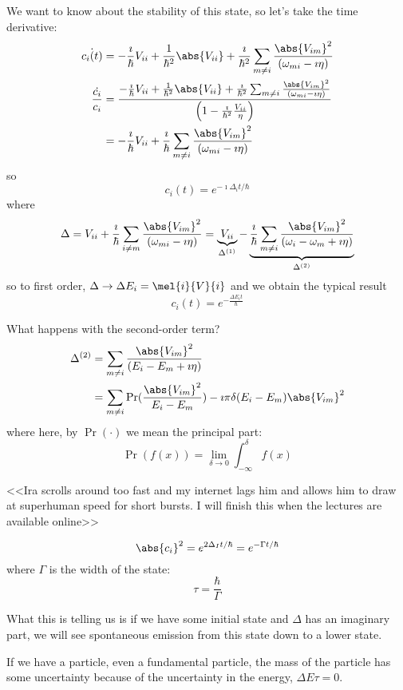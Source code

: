 \documentclass[a4paper,twoside,master.tex]{subfiles}
\begin{document}
We want to know about the stability of this state, so let's take the time derivative:
\begin{align}
    \dot{c_i(t)} &= - \frac{\imath}{\hbar} V_{ii} + \frac{1}{\hbar^2} \abs{V_{ii}} + \frac{\imath}{\hbar^2} \sum_{m \neq i} \frac{\abs{V_{im}}^2}{(\omega_{mi} - \imath \eta)} \\
    \frac{\dot{c_i}}{c_i} &= \frac{- \frac{\imath}{\hbar} V_{ii} + \frac{1}{\hbar^2} \abs{V_{ii}} + \frac{\imath}{\hbar^2} \sum_{m \neq i} \frac{\abs{V_{im}}^2}{(\omega_{mi} - \imath \eta)}}{\left( 1- \frac{\imath}{\hbar^2} \frac{V_{ii}}{\eta} \right)} \\
    &= - \frac{\imath}{\hbar} V_{ii} + \frac{\imath}{\hbar} \sum_{m \neq i} \frac{\abs{V_{im}}^2}{(\omega_{mi} - \imath \eta)}
\end{align}
so
\begin{equation}
    c_i(t) = e^{- \imath \Delta_i t / \hbar}
\end{equation}
where
\begin{equation}
    \Delta = V_{ii} + \frac{\imath}{\hbar} \sum_{i \neq m} \frac{\abs{V_{im}}^2}{(\omega_{mi} - \imath \eta)} = \underbrace{V_{ii}}_{\Delta^{(1)}} - \underbrace{\frac{\imath}{\hbar} \sum_{m \neq i} \frac{\abs{V_{im}}^2}{(\omega_i - \omega_m + \imath \eta)}}_{\Delta^{(2)}}
\end{equation}
so to first order, $ \Delta \to \Delta E_i = \mel{i}{V}{i} $ and we obtain the typical result
\begin{equation}
    c_i(t) = e^{- \frac{\Delta E_i t}{\hbar}}
\end{equation}

What happens with the second-order term?
\begin{align}
    \Delta^{(2)} &= \sum_{m \neq i} \frac{\abs{V_{im}}^2}{(E_i - E_m + \imath \eta)} \\
    &= \sum_{m \neq i} \Pr(\frac{\abs{V_{im}}^2}{E_i -E_m}) - \imath \pi \delta(E_i - E_m) \abs{V_{im}}^2
\end{align}
where here, by $ \Pr( \cdot) $ we mean the principal part:
\begin{equation}
    \Pr(f(x)) = \lim_{\delta \to 0} \int_{- \infty}^{\delta} f(x) 
\end{equation}

<<Ira scrolls around too fast and my internet lags him and allows him to draw at superhuman speed for short bursts. I will finish this when the lectures are available online>>

\begin{equation}
    \abs{c_i}^2 = e^{2 \Delta_I t / \hbar} = e^{- \Gamma t / \hbar}
\end{equation}
where $ \Gamma $ is the width of the state:
\begin{equation}
    \tau = \frac{\hbar}{\Gamma}
\end{equation}

What this is telling us is if we have some initial state and $ \Delta $ has an imaginary part, we will see spontaneous emission from this state down to a lower state.

If we have a particle, even a fundamental particle, the mass of the particle has some uncertainty because of the uncertainty in the energy, $ \Delta E \tau = 0 $.
\end{document}
